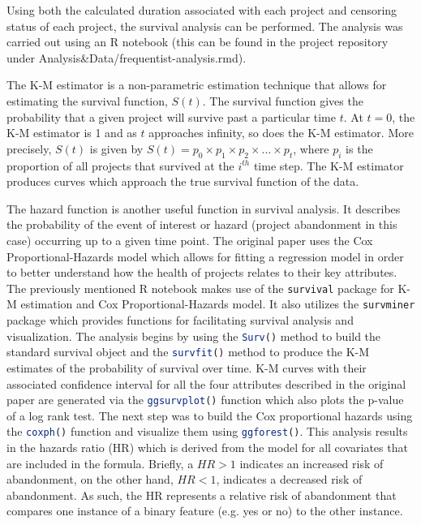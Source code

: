 \documentclass[acmconf]{acmart}
\begin{document}
Using both the calculated duration associated with each project and censoring status of each project, the survival analysis can be performed.
The analysis was carried out using an R notebook (this can be found in the project repository under Analysis\&Data/frequentist-analysis.rmd).

The K-M estimator is a non-parametric estimation technique that allows for estimating the survival function, $S(t)$. 
The survival function gives the probability that a given project will survive past a particular time $t$.
At $t = 0$, the K-M estimator is 1 and as $t$ approaches infinity, so does the K-M estimator.
More precisely, $S(t)$ is given by  $S(t) = p_0 \times p_1 \times p_2 \times \dots \times p_t$, where $p_i$ is the proportion of all projects that survived at the $i^{th}$ time step.
The K-M estimator produces curves which approach the true survival function of the data.

The hazard function is another useful function in survival analysis. It describes the probability of the event of interest or hazard (project abandonment in this case) occurring up to a given time point.
The original paper uses the Cox Proportional-Hazards model which allows for fitting a regression model in order to better understand how the health of projects relates to their key attributes. 
The previously mentioned R notebook makes use of the \lstinline[language=R]!survival! package for K-M estimation and Cox Proportional-Hazards model.
It also utilizes the \lstinline[language=R]!survminer! package which provides functions for facilitating survival analysis and visualization. 
The analysis begins by using the \lstinline[language=R]!Surv()! method to build the standard survival object and the \lstinline[language=R]!survfit()! method to produce the K-M estimates of the probability of survival over time.
K-M curves with their associated confidence interval for all the four attributes described in the original paper are generated via the \lstinline[language=R]!ggsurvplot()! function which also plots the p-value of a log rank test. 
The next step was to build the Cox proportional hazards using the \lstinline[language=R]!coxph()! function and visualize them using \lstinline[language=R]!ggforest()!. 
This analysis results in the hazards ratio (HR) which is derived from the model for all covariates that are included in the formula. 
Briefly, a $HR > 1$ indicates an increased risk of abandonment, on the other hand, $HR < 1$, indicates a decreased risk of abandonment. 
As such, the HR represents a relative risk of abandonment that compares one instance of a binary feature (e.g. yes or no) to the other instance.
\end{document}
